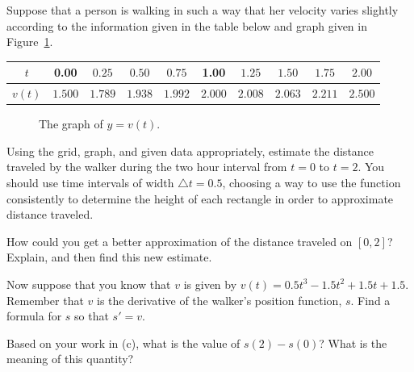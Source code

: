 \begin{activity} \label{A:4.1.1}  Suppose that a person is walking in such a way that her velocity varies slightly according to the information given in the table below and graph given in Figure~\ref{F:4.1.Act1}.
\begin{center} 
\begin{tabular}{c|c|c|c|c|c|c|c|c|c}
$t$ & 0.00 & $0.25$ & $0.50$ & $0.75$ & 1.00 & $1.25$ & $1.50$ & $1.75$ & $2.00$ \\ \hline %
$v(t)$ & $1.500$ & $1.789$ & $1.938$ & $1.992$ & $2.000$ & $2.008$ & $2.063$ & $2.211$ & $2.500$ \\ %
\end{tabular}
\end{center}
\begin{figure}[h]
\begin{center}
\end{center}
\caption{The graph of $y = v(t)$.} \label{F:4.1.Act1}
\end{figure}
\ba
	\item Using the grid, graph, and given data appropriately, estimate the distance traveled by the walker during the two hour interval from $t = 0$ to $t = 2$.  You should use time intervals of width $\triangle t = 0.5$, choosing a way to use the function consistently to determine the height of each rectangle in order to approximate distance traveled.
	\item How could you get a better approximation of the distance traveled on $[0,2]$?  Explain, and then find this new estimate.
	\item Now suppose that you know that $v$ is given by $v(t) = 0.5t^3-1.5t^2+1.5t+1.5$. Remember that $v$ is the derivative of the walker's position function, $s$.  Find a formula for $s$ so that $s' = v$.
	\item Based on your work in (c), what is the value of $s(2) - s(0)$?  What is the meaning of this quantity? 
\ea
\end{activity}
